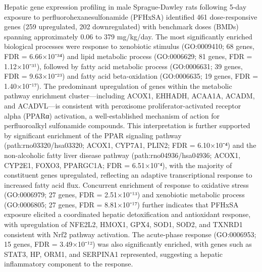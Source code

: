 Hepatic gene expression profiling in male Sprague-Dawley rats following 5-day exposure to perfluorohexanesulfonamide (PFHxSA) identified 461 dose-responsive genes (259 upregulated, 202 downregulated) with benchmark doses (BMDs) spanning approximately 0.06 to 379 mg/kg/day. The most significantly enriched biological processes were response to xenobiotic stimulus (GO:0009410; 68 genes, FDR = 6.66×10⁻³⁴) and lipid metabolic process (GO:0006629; 81 genes, FDR = 1.12×10⁻³¹), followed by fatty acid metabolic process (GO:0006631; 39 genes, FDR = 9.63×10⁻²³) and fatty acid beta-oxidation (GO:0006635; 19 genes, FDR = 1.40×10⁻¹⁷). The predominant upregulation of genes within the metabolic pathway enrichment cluster—including ACOX1, EHHADH, ACAA1A, ACADM, and ACADVL—is consistent with peroxisome proliferator-activated receptor alpha (PPARα) activation, a well-established mechanism of action for perfluoroalkyl sulfonamide compounds. This interpretation is further supported by significant enrichment of the PPAR signaling pathway (path:rno03320/hsa03320; ACOX1, CYP7A1, PLIN2; FDR = 6.10×10⁻⁴) and the non-alcoholic fatty liver disease pathway (path:rno04936/hsa04936; ACOX1, CYP2E1, FOXO3, PPARGC1A; FDR = 6.51×10⁻⁴), with the majority of constituent genes upregulated, reflecting an adaptive transcriptional response to increased fatty acid flux. Concurrent enrichment of response to oxidative stress (GO:0006979; 27 genes, FDR = 2.51×10⁻¹³) and xenobiotic metabolic process (GO:0006805; 27 genes, FDR = 8.81×10⁻¹⁷) further indicates that PFHxSA exposure elicited a coordinated hepatic detoxification and antioxidant response, with upregulation of NFE2L2, HMOX1, GPX4, SOD1, SOD2, and TXNRD1 consistent with Nrf2 pathway activation. The acute-phase response (GO:0006953; 15 genes, FDR = 3.49×10⁻¹²) was also significantly enriched, with genes such as STAT3, HP, ORM1, and SERPINA1 represented, suggesting a hepatic inflammatory component to the response.

